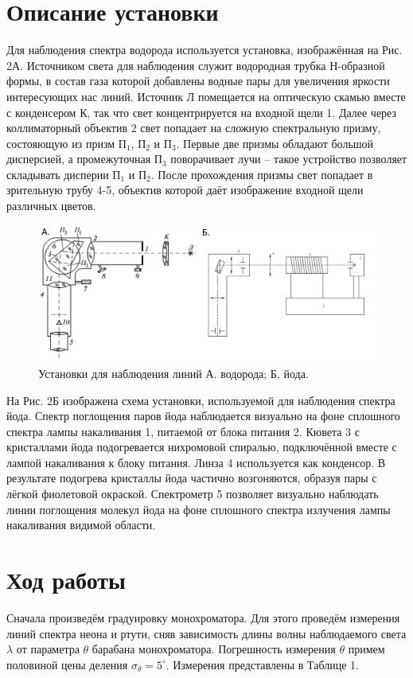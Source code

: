 \documentclass[a4paper,12pt]{article}
\begin{document}
\section*{Описание установки}
Для наблюдения спектра водорода используется установка, изображённая на Рис. 2А. Источником света для наблюдения служит водородная трубка Н-образной формы, в состав газа которой добавлены водные пары для увеличения яркости интересующих нас линий. Источник Л помещается на оптическую скамью вместе с конденсером К, так что свет концентрируется на входной щели 1. Далее через коллиматорный объектив 2 свет попадает на сложную спектральную призму, состояющую из призм П$_1$, П$_2$ и П$_3$. Первые две призмы обладают большой дисперсией, а промежуточная П$_3$ поворачивает лучи -- такое устройство позволяет складывать дисперии П$_1$ и П$_2$. После прохождения призмы свет попадает в зрительную трубу 4-5, объектив которой даёт изображение входной щели различных цветов.
\newpage
\begin{figure}[h]
\includegraphics[scale=0.5]{2.png}
\centering
\caption{Установки для наблюдения линий А. водорода; Б. йода.}
\end{figure} 
На Рис. 2Б изображена схема установки, используемой для наблюдения спектра йода. Спектр поглощения паров йода наблюдается визуально на фоне сплошного спектра лампы накаливания 1, питаемой от блока питания 2. Кювета 3 с кристаллами йода подогревается нихромовой спиралью, подключённой вместе с лампой накаливания к блоку питания. Линза 4 используется как конденсор. В результате подогрева кристаллы йода частично возгоняются, образуя пары
с лёгкой фиолетовой окраской. Спектрометр 5 позволяет визуально наблюдать линии поглощения молекул йода на фоне сплошного спектра излучения лампы накаливания видимой области.

\section*{Ход работы}
Сначала произведём градуировку монохроматора. Для этого проведём измерения линий спектра неона и ртути, сняв зависимость длины волны наблюдаемого света $\lambda$ от параметра $\theta$ барабана монохроматора. Погрешность измерения $\theta$ примем половиной цены деления $\sigma_\theta = 5^\circ$. Измерения представлены в Таблице 1.
\end{document}
